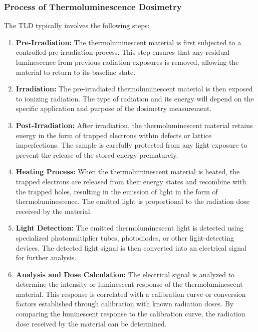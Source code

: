 \documentclass[../introduction.tex]{subfiles}
\begin{document}
    \subsubsection*{\large Process of Thermoluminescence Dosimetry}
        The TLD typically involves the following steps:
        \begin{enumerate}
            \item \textbf{Pre-Irradiation: } The thermoluminescent material is first subjected to a controlled 
            pre-irradiation process. This step ensures that any residual luminescence from previous radiation 
            exposures is removed, allowing the material to return to its baseline state.

            \item \textbf{Irradiation: } The pre-irradiated thermoluminescent material is then exposed to ionizing 
            radiation. The type of radiation and its energy will depend on the specific application and purpose of 
            the dosimetry measurement.

            \item \textbf{Post-Irradiation: } After irradiation, the thermoluminescent material retains energy in the 
            form of trapped electrons within defects or lattice imperfections. The sample is carefully protected from 
            any light exposure to prevent the release of the stored energy prematurely.

            \item \textbf{Heating Process: } When the thermoluminescent material is heated, the trapped electrons are 
            released from their energy states and recombine with the trapped holes, resulting in the emission of light 
            in the form of thermoluminescence. The emitted light is proportional to the radiation dose received by the 
            material.

            \item \textbf{Light Detection: } The emitted thermoluminescent light is detected using specialized 
            photomultiplier tubes, photodiodes, or other light-detecting devices. The detected light signal is then 
            converted into an electrical signal for further analysis.

            \item \textbf{Analysis and Dose Calculation: } The electrical signal is analyzed to determine the intensity 
            or luminescent response of the thermoluminescent material. This response is correlated with a calibration 
            curve or conversion factors established through calibration with known radiation doses. By comparing the 
            luminescent response to the calibration curve, the radiation dose received by the material can be determined.

        \end{enumerate}
\end{document}
